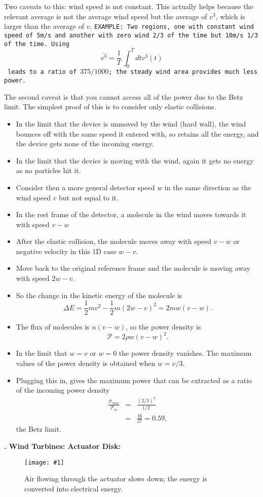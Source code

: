 \documentclass[11pt]{book}
\def\be{\begin{equation}}
\def\ee{\end{equation}}
\def\bea{\begin{eqnarray}}
\def\eea{\end{eqnarray}}
\newcommand{\vs}{\nonumber\\}
\newcommand{\sfig}[2]{
\texttt{[image: \#1]}
        }
\newcommand{\Sjpg}[2]{
   \begin{figure}[thbp]
   \begin{center}
    \sfig{../Figures/#1.jpg}{0.6\columnwidth}
    \caption{{\small #2}}
    \label{fig:#1}
     \end{center}
   \end{figure}
}
\newcommand\example[1]{{\tt EXAMPLE: #1}}
\newcommand\bei{\begin{itemize}}
\newcommand\eei{\end{itemize}}
\newcounter{lectureno}
\newcounter{secno}
\newcommand\lsection[1]{
\addtocounter{secno}{1}
{\bf \arabic{lectureno}.\alph{secno} #1:}}
\begin{document}
Two caveats to this: wind speed is not constant. This actually helps because the relevant average is not the average wind speed but the average of $v^3$, which is larger than the average of $v$. 
\example{Two regions, one with constant wind speed of 5m/s and another with zero wind 2/3 of the time but 10m/s 1/3 of the time. Using
\be
\bar{v^3} = \frac1T\,\int_0^T dt v^3(t)\ee
leads to a ratio of $375/1000$; the steady wind area provides much less power.}

The second caveat is that you cannot access all of the power due to the Betz limit. The simplest proof of this is to consider only elastic collisions.
\bei
\item In the limit that the device is unmoved by the wind (hard wall), the wind bounces off with the same speed it entered with, so retains all the energy, and the device gets none of the incoming energy.
\item In the limit that the device is moving with the wind, again it gets no energy as no particles hit it.
\item Consider then a more general detector speed $w$ in the same direction as the wind speed $v$ but not equal to it.
\item In the rest frame of the detector, a molecule in the wind moves towards it with speed $v-w$
\item After the elastic collision, the molecule moves away with speed $v-w$ or negative velocity in this 1D case $w-v$. 
\item Move back to the original reference frame and the molecule is moving away with speed $2w-v$.
\item So the change in the kinetic energy of the molecule is 
\be
\Delta E = \frac12mv^2 - \frac12m(2w-v)^2=2mw(v-w).\ee
\item The flux of molecules is $n(v-w)$, so the power density is
\be
\mathcal{P} = 2\rho w(v-w)^2.\ee
\item In the limit that $w=v$ or $w=0$ the power density vanishes. The maximum values of the power density is obtained when $w=v/3$. 
\item Plugging this in, gives the maximum power that can be extracted as a ratio of the incoming power density
\bea
\frac{\mathcal{P}_{max}}{\mathcal{P}_{in}} &=& \frac{(2/3)^3}{1/2}
\vs
&=&
\frac{16}{27}=0.59,
\eea
the Betz limit.
\eei

\lsection{Wind Turbines: Actuator Disk}

\Sjpg{turbine}{Air flowing through the actuator slows down; the energy is converted into electrical energy.}
\end{document}
